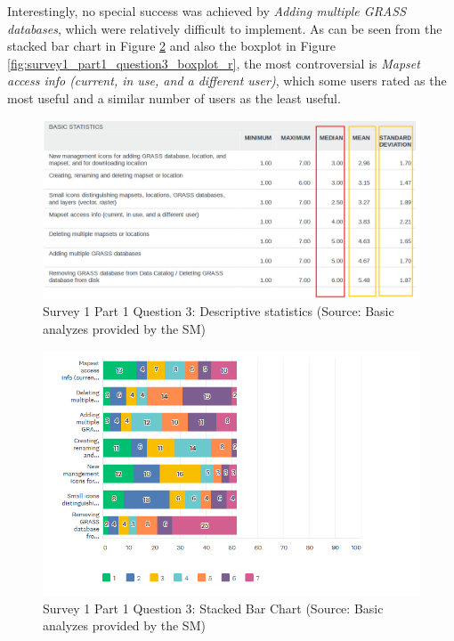 \documentclass[a4paper,10pt,twoside]{article}
\begin{document}
Interestingly, no special success was achieved by \textit{Adding multiple GRASS databases}, which were relatively difficult to implement. As can be seen from the stacked bar chart in Figure \ref{fig:survey1_part1_question3_histogram} and also the boxplot in Figure \ref{fig:survey1_part1_question3_boxplot_r}, the most controversial is \textit{Mapset access info (current, in use, and a different user)}, which some users rated as the most useful and a similar number of users as the least useful.

\vspace{0.3cm}
\begin{figure}[hbt!] 
\begin{center}
\includegraphics[width=17cm]{../surveys/analyzed_data/survey1_part1_question3_descriptive_stats_sm.png} 
\caption[Survey 1 Part 1 Question 3: Descriptive statistics]{Survey 1 Part 1 Question 3: Descriptive statistics (Source: Basic analyzes provided by the SM)}
\label{fig:survey1_part1_question3_descriptive_stats_sm}
\end{center}
\end{figure}

\vspace{0.3cm}
\begin{figure}[hbt!] 
\begin{center}
\includegraphics[width=17cm]{../surveys/analyzed_data/survey1_part1_question3_histogram.png} 
\caption[Survey 1 Part 1 Question 3: Stacked Bar Chart ]{Survey 1 Part 1 Question 3: Stacked Bar Chart (Source: Basic analyzes provided by the SM)}
\label{fig:survey1_part1_question3_histogram}
\end{center}
\end{figure}
\end{document}
